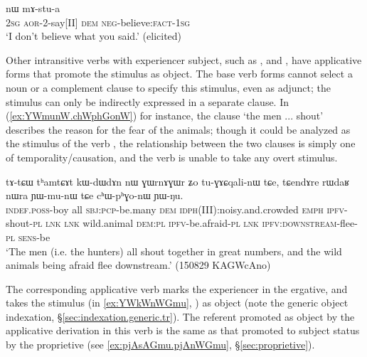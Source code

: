 \begin{exe}
\ex \label{ex:tAtWtWt.nW.mAstua}
 nɯ mɤ-stu-a \\
\textsc{2sg} \textsc{aor}-2-say[II] \textsc{dem} \textsc{neg}-believe:\textsc{fact}-\textsc{1sg} \\
\glt `I don't believe what you said.' (elicited)
\end{exe}

Other intransitive verbs with experiencer subject, such as ,  and , have applicative forms that promote the stimulus as object. The base verb forms cannot select a noun or a complement clause to specify this stimulus, even as adjunct; the stimulus can only be indirectly expressed in a separate clause. In (\ref{ex:YWmunW.chWphGonW}) for instance, the clause  `the men ... shout' describes the reason for the fear of the animals; though it could be analyzed as the stimulus of the verb , the relationship between the two clauses is simply one of temporality/causation, and the verb  is unable to take any overt stimulus.

\begin{exe}
\ex \label{ex:YWmunW.chWphGonW}
\gll  tɤ-tɕɯ tʰamtɕɤt kɯ-dɯ\redp{}dɤn nɯ ɣɯrnɤɣɯr ʑo tu-ɣɤɕqali-nɯ tɕe, tɕendɤre rɯdaʁ nɯra ɲɯ-mu-nɯ tɕe cʰɯ-pʰɣo-nɯ ɲɯ-ŋu. \\
\textsc{indef}.\textsc{poss}-boy all \textsc{sbj}:\textsc{pcp}-be.many \textsc{dem} \textsc{idph}(III):noisy.and.crowded \textsc{emph} \textsc{ipfv}-shout-\textsc{pl} \textsc{lnk} \textsc{lnk} wild.animal \textsc{dem}:\textsc{pl} \textsc{ipfv}-be.afraid-\textsc{pl} \textsc{lnk} \textsc{ipfv}:\textsc{downstream}-flee-\textsc{pl} \textsc{sens}-be \\
\glt `The men (i.e. the hunters) all shout together in great numbers, and the wild animals being afraid flee downstream.' (150829 KAGWcAno)
\end{exe}


The corresponding applicative verb  marks the experiencer in the ergative, and takes the stimulus (in \ref{ex:YWkWnWGmu}, ) as object (note the generic object indexation, §\ref{sec:indexation.generic.tr}). The referent promoted as object by the applicative derivation in this verb is the same as that promoted to subject status by the proprietive  (see \ref{ex:pjAsAGmu.pjAnWGmu}, §\ref{sec:proprietive}).

